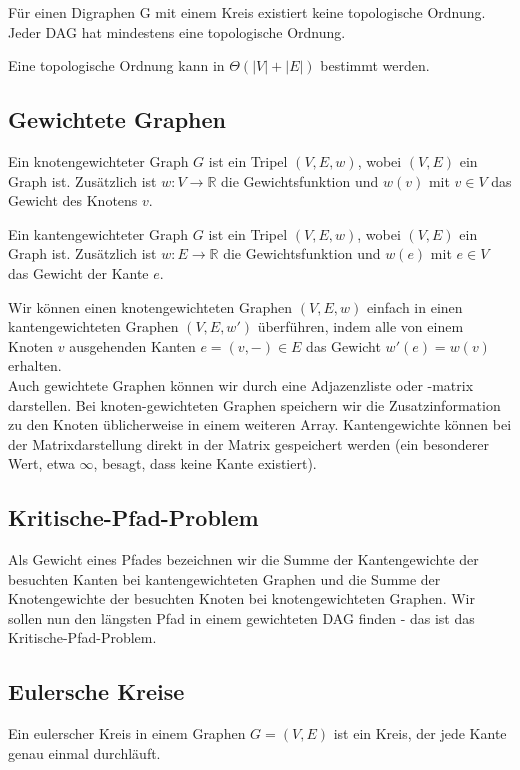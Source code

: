 \documentclass[12pt]{article}
\begin{document}
Für einen Digraphen G mit einem Kreis existiert keine topologische Ordnung. Jeder DAG hat mindestens eine topologische Ordnung.

Eine topologische Ordnung kann in $\Theta(|V| + |E|)$ bestimmt werden.

\subsection{Gewichtete Graphen}

Ein knotengewichteter Graph $G$ ist ein Tripel $(V, E, w)$, wobei $(V, E)$ ein Graph ist. Zusätzlich ist $w : V \rightarrow \mathbb{R}$ die Gewichtsfunktion und $w(v)$ mit $v \in V$ das Gewicht des Knotens $v$.

Ein kantengewichteter Graph $G$ ist ein Tripel $(V, E, w)$, wobei $(V, E)$ ein Graph ist. Zusätzlich ist $w : E \rightarrow \mathbb{R}$ die Gewichtsfunktion und $w(e)$ mit $e \in V$ das Gewicht der Kante $e$.

Wir können einen knotengewichteten Graphen $(V, E, w)$ einfach in einen kantengewichteten Graphen $(V, E, w')$ überführen, indem alle von einem Knoten $v$ ausgehenden Kanten $e = (v, -) \in E$ das Gewicht $w'(e) = w(v)$ erhalten.\\

Auch gewichtete Graphen können wir durch eine Adjazenzliste oder -matrix darstellen. Bei knoten-gewichteten Graphen speichern wir die Zusatzinformation zu den Knoten üblicherweise in einem weiteren Array. Kantengewichte können bei der Matrixdarstellung direkt in der Matrix gespeichert werden (ein besonderer Wert, etwa $\infty$, besagt, dass keine Kante existiert).

\subsection{Kritische-Pfad-Problem}

Als Gewicht eines Pfades bezeichnen wir die Summe der Kantengewichte der besuchten Kanten bei kantengewichteten Graphen und die Summe der Knotengewichte der besuchten Knoten bei knotengewichteten Graphen. Wir sollen nun den längsten Pfad in einem gewichteten DAG finden - das ist das Kritische-Pfad-Problem.

\subsection{Eulersche Kreise}

Ein eulerscher Kreis in einem Graphen $G = (V, E)$ ist ein Kreis, der jede Kante genau einmal durchläuft. 
\end{document}
